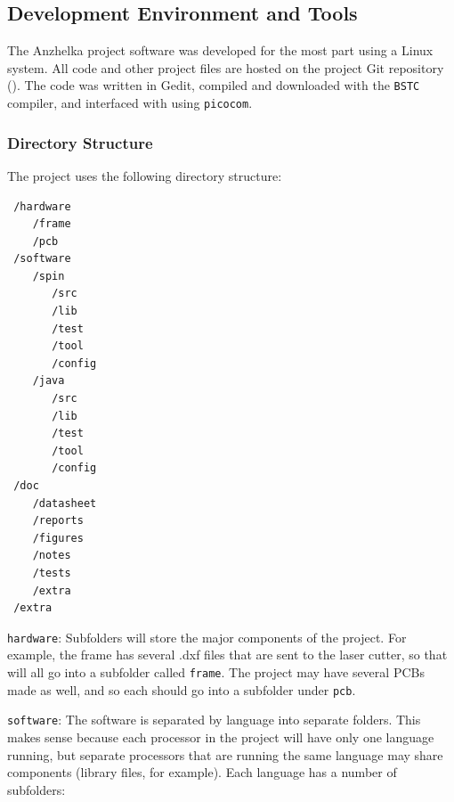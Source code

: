 \documentclass{article}
\numberwithin{equation}{section} %
\begin{document}
\subsection{Development Environment and Tools}

The Anzhelka project software was developed for the most part using a Linux system. All code and other project files are hosted on the project Git repository (\cite{anzhelka_code}). The 
 code was written in Gedit, compiled and downloaded with the \texttt{BSTC} compiler, and interfaced with using \texttt{picocom}.


\subsubsection{Directory Structure}

The project uses the following directory structure:
\begin{lstlisting}
 /hardware 
    /frame 
    /pcb 
 /software 
    /spin 
       /src 
       /lib 
       /test 
       /tool 
       /config 
    /java 
       /src 
       /lib 
       /test 
       /tool 
       /config 
 /doc 
    /datasheet 
    /reports 
    /figures 
    /notes 
    /tests 
    /extra 
 /extra 
\end{lstlisting} 
 
 
\texttt{hardware}:
Subfolders will store the major components of the project. For example, the frame has several .dxf files that are sent to the laser cutter, so that will all go into a subfolder called \texttt{frame}. The project may have several PCBs made as well, and so each should go into a subfolder under \texttt{pcb}. 

\texttt{software}:
The software is separated by language into separate folders. This makes sense because each processor in the project will have only one language running, but separate processors that are running the same language may share components (library files, for example). Each language has a number of subfolders: 
\end{document}
